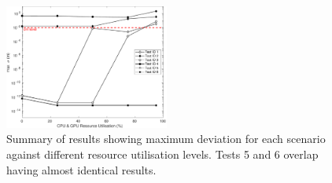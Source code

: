 \documentclass[letterpaper, 10 pt, journal, twoside]{IEEEtran}
\begin{document}
\begin{figure}[!t]
    \centering
    \includegraphics[width=0.48\textwidth]{Other/Figures/ExperimentsStressSummaryV4.pdf}
    \caption{Summary of results showing maximum deviation for each scenario against different resource utilisation levels. Tests 5 and 6 overlap having almost identical results.}
    \label{ExperimentsStressSummary}
\end{figure}





\end{document}
